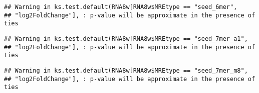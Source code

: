 \documentclass[
]{article}
\newenvironment{Shaded}{\begin{snugshade}}{\end{snugshade}}
\newcommand{\FunctionTok}[1]{\textcolor[rgb]{0.13,0.29,0.53}{\textbf{#1}}}
\newcommand{\NormalTok}[1]{#1}
\newcommand{\OtherTok}[1]{\textcolor[rgb]{0.56,0.35,0.01}{#1}}
\newcommand{\SpecialCharTok}[1]{\textcolor[rgb]{0.81,0.36,0.00}{\textbf{#1}}}
\newcommand{\StringTok}[1]{\textcolor[rgb]{0.31,0.60,0.02}{#1}}
\begin{document}
\begin{verbatim}
## Warning in ks.test.default(RNA8w[RNA8w$MREtype == "seed_6mer",
## "log2FoldChange"], : p-value will be approximate in the presence of ties
\end{verbatim}

\begin{Shaded}
\end{Shaded}

\begin{verbatim}
## Warning in ks.test.default(RNA8w[RNA8w$MREtype == "seed_7mer_a1",
## "log2FoldChange"], : p-value will be approximate in the presence of ties
\end{verbatim}

\begin{Shaded}
\end{Shaded}

\begin{verbatim}
## Warning in ks.test.default(RNA8w[RNA8w$MREtype == "seed_7mer_m8",
## "log2FoldChange"], : p-value will be approximate in the presence of ties
\end{verbatim}

\begin{Shaded}
\end{Shaded}
\end{document}
